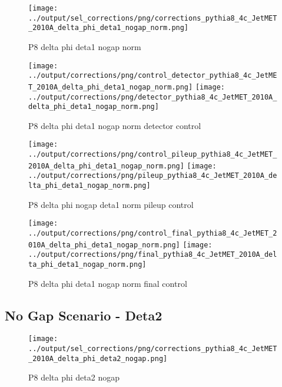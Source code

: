 \documentclass[11pt]{book}
\begin{document}
\begin{figure}[ht]
\centering
\texttt{[image: ../output/sel\_corrections/png/corrections\_pythia8\_4c\_JetMET\_2010A\_delta\_phi\_deta1\_nogap\_norm.png]}
\caption{P8 delta phi deta1 nogap norm}
\label{fig:p8_JetMET_2010A_delta_phi_deta1_nogap_norm}
\end{figure}

\begin{figure}[ht]
\centering
\texttt{[image: ../output/corrections/png/control\_detector\_pythia8\_4c\_JetMET\_2010A\_delta\_phi\_deta1\_nogap\_norm.png]}
\texttt{[image: ../output/corrections/png/detector\_pythia8\_4c\_JetMET\_2010A\_delta\_phi\_deta1\_nogap\_norm.png]}
\caption{P8 delta phi deta1 nogap norm detector control}
\label{fig:p8_JetMET_2010A_delta_phi_deta1_nogap_norm_detector_control}
\end{figure}

\begin{figure}[ht]
\centering
\texttt{[image: ../output/corrections/png/control\_pileup\_pythia8\_4c\_JetMET\_2010A\_delta\_phi\_deta1\_nogap\_norm.png]}
\texttt{[image: ../output/corrections/png/pileup\_pythia8\_4c\_JetMET\_2010A\_delta\_phi\_deta1\_nogap\_norm.png]}
\caption{P8 delta phi nogap deta1 norm pileup control}
\label{fig:p8_JetMET_2010A_delta_phi_deta1_nogap_norm_pileup_control}
\end{figure}


\begin{figure}[ht]
\centering
\texttt{[image: ../output/corrections/png/control\_final\_pythia8\_4c\_JetMET\_2010A\_delta\_phi\_deta1\_nogap\_norm.png]}
\texttt{[image: ../output/corrections/png/final\_pythia8\_4c\_JetMET\_2010A\_delta\_phi\_deta1\_nogap\_norm.png]}
\caption{P8 delta phi deta1 nogap norm final control}
\label{fig:p8_JetMET_2010A_delta_phi_deta1_nogap_norm_final_control}
\end{figure}


\clearpage
\subsection{No Gap Scenario - Deta2}
\begin{figure}[ht]
\centering
\texttt{[image: ../output/sel\_corrections/png/corrections\_pythia8\_4c\_JetMET\_2010A\_delta\_phi\_deta2\_nogap.png]}
\caption{P8 delta phi deta2 nogap}
\label{fig:p8_JetMET_2010A_delta_phi_deta2_nogap}
\end{figure}
\end{document}
